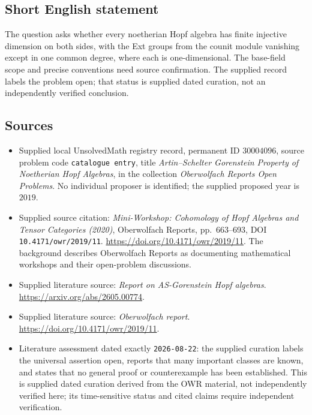 \documentclass[11pt]{article}
\begin{document}
\subsection{Short English statement}
The question asks whether every noetherian Hopf algebra has finite injective dimension on both sides, with the Ext groups from the counit module vanishing except in one common degree, where each is one-dimensional. The base-field scope and precise conventions need source confirmation. The supplied record labels the problem open; that status is supplied dated curation, not an independently verified conclusion.
\subsection{Sources}
\begin{itemize}
\item Supplied local UnsolvedMath registry record, permanent ID \(30004096\), source problem code \texttt{catalogue entry}, title \emph{Artin--Schelter Gorenstein Property of Noetherian Hopf Algebras}, in the collection \emph{Oberwolfach Reports Open Problems}. No individual proposer is identified; the supplied proposed year is \(2019\).
\item Supplied source citation: \emph{Mini-Workshop: Cohomology of Hopf Algebras and Tensor Categories (2020)}, Oberwolfach Reports, pp.\ 663--693, DOI \texttt{10.4171/owr/2019/11}. \url{https://doi.org/10.4171/owr/2019/11}. The background describes Oberwolfach Reports as documenting mathematical workshops and their open-problem discussions.
\item Supplied literature source: \emph{Report on AS-Gorenstein Hopf algebras}. \url{https://arxiv.org/abs/2605.00774}.
\item Supplied literature source: \emph{Oberwolfach report}. \url{https://doi.org/10.4171/owr/2019/11}.
\item Literature assessment dated exactly \texttt{2026-08-22}: the supplied curation labels the universal assertion open, reports that many important classes are known, and states that no general proof or counterexample has been established. This is supplied dated curation derived from the OWR material, not independently verified here; its time-sensitive status and cited claims require independent verification.
\end{itemize}
\end{document}
